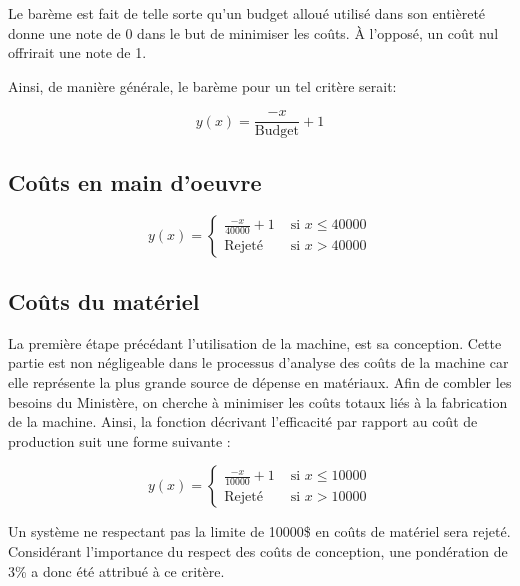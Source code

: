 Le barème est fait de telle sorte qu'un budget alloué utilisé dans son entièreté donne une note de 0 dans le but de minimiser les coûts. À l'opposé, un coût nul offrirait une note de 1.

Ainsi, de manière générale, le barème pour un tel critère serait:

\begin{equation}
    y(x)=\frac{-x}{\text{Budget}} + 1
\end{equation}

\subsection{Coûts en main d'oeuvre}
\label{cenmaindo}

\begin{equation}
y(x) = \begin{cases}
        \frac{-x}{40000} + 1 & \text{ si } x \leq 40000\\
        \text{Rejeté} & \text{ si } x > 40000
    \end{cases}
    \label{eq:bareme_cout_logiciel}
\end{equation}

\subsection{Coûts du matériel}
\label{ccdpsdsfsd}

La première étape précédant l’utilisation de la machine, est sa conception. Cette partie est non négligeable dans le processus d’analyse des coûts de la machine car elle représente la plus grande source de dépense en matériaux. Afin de combler les besoins du Ministère, on cherche à minimiser les coûts totaux liés à la fabrication de la machine. %
Ainsi, la fonction décrivant l’efficacité par rapport au coût de production suit une forme suivante :

\begin{equation}
y(x) = \begin{cases}
        \frac{-x}{10000} + 1 & \text{ si } x \leq 10000\\
        \text{Rejeté} & \text{ si } x > 10000
    \end{cases}
    \label{eq:bareme_cout_materiel}
\end{equation}

Un système ne respectant pas la limite de 10000\$ en coûts de matériel sera rejeté. Considérant l'importance du respect des coûts de conception, une pondération de 3\% a donc été attribué à ce critère.


